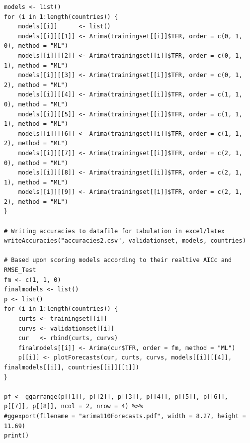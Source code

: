 \documentclass[a4paper, 12pt]{scrartcl}
\begin{document}
\begin{lstlisting}
models <- list()
for (i in 1:length(countries)) {
	models[[i]]      <- list()
	models[[i]][[1]] <- Arima(trainingset[[i]]$TFR, order = c(0, 1, 0), method = "ML")
	models[[i]][[2]] <- Arima(trainingset[[i]]$TFR, order = c(0, 1, 1), method = "ML")
	models[[i]][[3]] <- Arima(trainingset[[i]]$TFR, order = c(0, 1, 2), method = "ML")
	models[[i]][[4]] <- Arima(trainingset[[i]]$TFR, order = c(1, 1, 0), method = "ML")
	models[[i]][[5]] <- Arima(trainingset[[i]]$TFR, order = c(1, 1, 1), method = "ML")
	models[[i]][[6]] <- Arima(trainingset[[i]]$TFR, order = c(1, 1, 2), method = "ML")
	models[[i]][[7]] <- Arima(trainingset[[i]]$TFR, order = c(2, 1, 0), method = "ML")
	models[[i]][[8]] <- Arima(trainingset[[i]]$TFR, order = c(2, 1, 1), method = "ML")
	models[[i]][[9]] <- Arima(trainingset[[i]]$TFR, order = c(2, 1, 2), method = "ML")
}

# Writing accuracies to datafile for tabulation in excel/latex
writeAccuracies("accuracies2.csv", validationset, models, countries)

# Based upon scoring models according to their realtive AICc and RMSE_Test
fm <- c(1, 1, 0)
finalmodels <- list()
p <- list()
for (i in 1:length(countries)) {
	curts <- trainingset[[i]]
	curvs <- validationset[[i]]
	cur   <- rbind(curts, curvs)
	finalmodels[[i]] <- Arima(cur$TFR, order = fm, method = "ML")
	p[[i]] <- plotForecasts(cur, curts, curvs, models[[i]][[4]], finalmodels[[i]], countries[[i]][[1]])
}

pf <- ggarrange(p[[1]], p[[2]], p[[3]], p[[4]], p[[5]], p[[6]], p[[7]], p[[8]], ncol = 2, nrow = 4) %>%
#ggexport(filename = "arima110Forecasts.pdf", width = 8.27, height = 11.69)
print()
\end{lstlisting}
\end{document}
